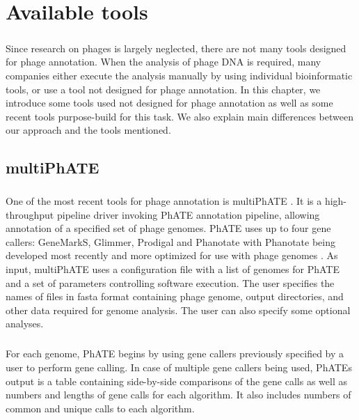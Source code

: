 \chapter{Available tools}

\label{kap:avtools} %
\paragraph*{}
Since research on phages is largely neglected, there are not many tools designed for phage annotation. When the analysis of phage DNA is required, many companies either execute the analysis manually by using individual bioinformatic tools, or use a tool not designed for phage annotation. In this chapter, we introduce some tools used not designed for phage annotation as well as some recent tools purpose-build for this task. We also explain main differences between our approach and the tools mentioned.
\section{multiPhATE}
\paragraph*{}
One of the most recent tools for phage annotation is multiPhATE \cite{10.1093/bioinformatics/btz258}. It is a high-throughput pipeline driver invoking PhATE annotation pipeline, allowing annotation of a specified set of phage genomes. PhATE uses up to four gene callers: GeneMarkS, Glimmer, Prodigal and Phanotate with Phanotate being developed most recently and more optimized for use with phage genomes \cite{10.1093/bioinformatics/btz265}.
As input, multiPhATE uses a configuration file with a list of genomes for PhATE and a set of parameters controlling software execution. The user specifies the names of files in fasta format containing phage genome, output directories, and other data required for genome analysis. The user can also specify some optional analyses.
\paragraph*{}
For each genome, PhATE begins by using gene callers previously specified by a user to perform gene calling. In case of multiple gene callers being used, PhATEs output is a table containing side-by-side comparisons of the gene calls as well as numbers and lengths of gene calls for each algorithm. It also includes numbers of common and unique calls to each algorithm. 
